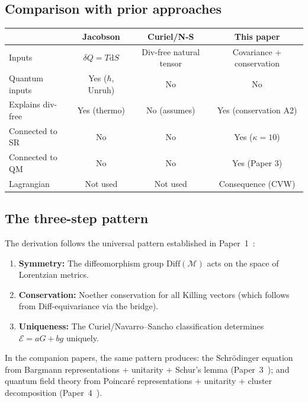 \documentclass[12pt]{article}
\theoremstyle{plain}
\theoremstyle{definition}
\theoremstyle{remark}
\newcommand{\Diff}{\mathrm{Diff}}
\newcommand{\dd}{\mathrm{d}}
\begin{document}
\subsection{Comparison with prior approaches}

\begin{center}\small
\begin{tabular}{lccc}\toprule
& \textbf{Jacobson} & \textbf{Curiel/N-S} & \textbf{This paper} \\\midrule
Inputs & $\delta Q = T\dd S$ & Div-free natural tensor & Covariance + conservation \\
Quantum inputs & Yes ($\hbar$, Unruh) & No & No \\
Explains div-free & Yes (thermo) & No (assumes) & Yes (conservation A2) \\
Connected to SR & No & No & Yes ($\kappa = 10$) \\
Connected to QM & No & No & Yes (Paper 3) \\
Lagrangian & Not used & Not used & Consequence (CVW) \\
\bottomrule
\end{tabular}
\end{center}

\subsection{The three-step pattern}

The derivation follows the universal pattern established in Paper~1~\cite{nembe2026p1}:
\begin{enumerate}
    \item \textbf{Symmetry:} The diffeomorphism group $\Diff(\mathcal{M})$ acts on the space of Lorentzian metrics.
    \item \textbf{Conservation:} Noether conservation for all Killing vectors (which follows from Diff-equivariance via the bridge).
    \item \textbf{Uniqueness:} The Curiel/Navarro--Sancho classification determines $\mathcal{E} = aG + bg$ uniquely.
\end{enumerate}

In the companion papers, the same pattern produces: the Schr\"odinger equation from Bargmann representations + unitarity + Schur's lemma (Paper~3~\cite{nembe2026p3}); and quantum field theory from Poincar\'e representations + unitarity + cluster decomposition (Paper~4~\cite{nembe2026p4}).


\end{document}
